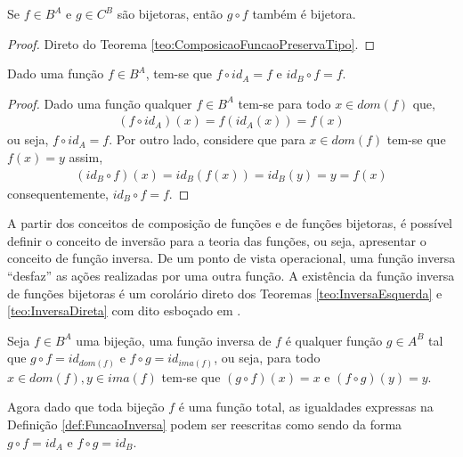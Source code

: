\begin{corolario}\label{col:ComposicaoFuncaoPreservaTipo}
	Se $f \in B^A$ e $g \in C^B$ são bijetoras, então $g \circ f$ também é bijetora.
\end{corolario}

\begin{proof}
	Direto do Teorema \ref{teo:ComposicaoFuncaoPreservaTipo}.
\end{proof}

\begin{teorema}\label{teo:NeutralidadeDaFuncaoIdentidade}
	Dado uma função $f \in B^A$, tem-se que $f \circ id_A = f$ e $id_B \circ f = f$.
\end{teorema}

\begin{proof}
	Dado uma função qualquer $f \in B^A$ tem-se para todo $x \in dom(f)$ que, 
	\begin{eqnarray*}
		(f \circ id_A)(x) = f(id_A(x)) = f(x)
	\end{eqnarray*}
	ou seja, $f \circ id_A = f$. Por outro lado, considere que para $x \in dom(f)$ tem-se que $f(x) = y$ assim,
	\begin{eqnarray*}
		(id_B \circ f)(x) = id_B(f(x)) = id_B(y) = y = f(x)
	\end{eqnarray*}
	consequentemente, $id_B \circ f = f$.
\end{proof}

A partir dos conceitos de composição de funções e de funções bijetoras, é possível definir o conceito de inversão para a teoria das funções, ou seja, apresentar o conceito de função inversa. De um ponto de vista operacional, uma função inversa ``desfaz'' as ações realizadas por uma outra função. A existência da função inversa de funções bijetoras é um corolário direto dos Teoremas \ref{teo:InversaEsquerda} e \ref{teo:InversaDireta} com dito esboçado em \cite{zach2021-TC}.

\begin{definicao}\label{def:FuncaoInversa}
	Seja $f \in B^A$ uma bijeção, uma função inversa de $f$ é qualquer função $g \in A^B$ tal que $g \circ f = id_{dom(f)}$ e $f \circ g = id_{ima(f)}$, ou seja, para todo $x \in dom(f), y \in ima(f)$ tem-se que $(g \circ f)(x) = x$ e $(f \circ g)(y) = y$.
\end{definicao}

Agora dado que toda bijeção $f$ é uma função total, as igualdades expressas na Definição \ref{def:FuncaoInversa} podem ser reescritas como sendo da forma $g \circ f = id_{A}$ e $f \circ g = id_{B}$.

